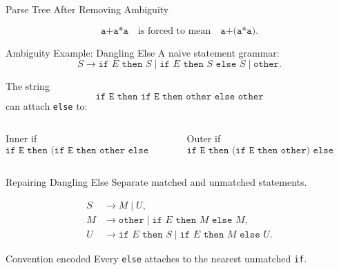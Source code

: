 \documentclass[aspectratio=169,10pt]{beamer}
\newcommand{\code}[1]{\texttt{#1}}
\begin{document}
\begin{frame}{Parse Tree After Removing Ambiguity}
\small
\centering
{}

\vspace{0.5em}
\[
\code{a+a*a}\quad\text{is forced to mean}\quad \code{a+(a*a)}.
\]
\end{frame}

\begin{frame}{Ambiguity Example: Dangling Else}
\small
A naive statement grammar:
\[
S\to \code{if }E\code{ then }S
\mid \code{if }E\code{ then }S\code{ else }S
\mid \code{other}.
\]

The string
\[
\code{if E then if E then other else other}
\]
can attach \code{else} to:

\begin{columns}[T,onlytextwidth]
\begin{block}{Inner if}
\[
\code{if E then (if E then other else other)}
\]
\end{block}

\begin{alertblock}{Outer if}
\[
\code{if E then (if E then other) else other}
\]
\end{alertblock}
\end{columns}
\end{frame}

\begin{frame}{Repairing Dangling Else}
\small
Separate matched and unmatched statements.

\[
\begin{aligned}
S&\to M\mid U,\\
M&\to \code{other}\mid \code{if }E\code{ then }M\code{ else }M,\\
U&\to \code{if }E\code{ then }S
\mid \code{if }E\code{ then }M\code{ else }U.
\end{aligned}
\]

\begin{exampleblock}{Convention encoded}
Every \code{else} attaches to the nearest unmatched \code{if}.
\end{exampleblock}
\end{frame}
\end{document}
